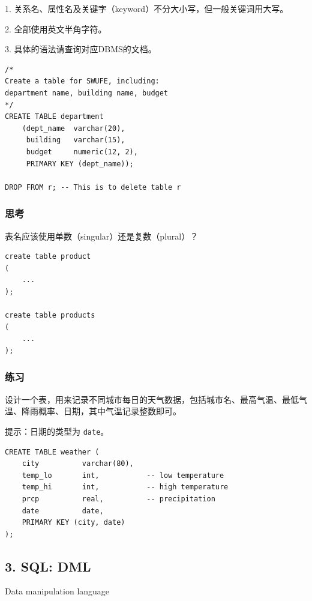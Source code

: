 \documentclass[aspectratio=169, 14pt]{beamer}
\begin{document}
{
\begin{frame}[standout]
    1. 关系名、属性名及关键字（keyword）不分大小写，但一般关键词用大写。

    2. 全部使用英文半角字符。

    3. 具体的语法请查询对应DBMS的文档。
\end{frame}
}

\begin{frame}[fragile]
    \begin{verbatim}
/*
Create a table for SWUFE, including:
department name, building name, budget
*/        
CREATE TABLE department
    (dept_name  varchar(20),
     building   varchar(15),
     budget     numeric(12, 2),
     PRIMARY KEY (dept_name)); 

DROP FROM r; -- This is to delete table r
    \end{verbatim}
\end{frame}
\begin{frame}[fragile]
    \frametitle{思考}
    {\large {}} 表名应该使用单数（singular）还是复数（plural）？

\begin{verbatim}
create table product
(
    ...
);

create table products
(
    ...
);
\end{verbatim}
\end{frame}
\begin{frame}
    \frametitle{练习}
    
    {\large {}} 设计一个表，用来记录不同城市每日的天气数据，包括城市名、最高气温、最低气温、降雨概率、日期，其中气温记录整数即可。

    提示：日期的类型为 \texttt{date}。
\end{frame}

\begin{frame}[fragile]
    \begin{verbatim}
CREATE TABLE weather (
    city          varchar(80),
    temp_lo       int,           -- low temperature
    temp_hi       int,           -- high temperature
    prcp          real,          -- precipitation
    date          date,
    PRIMARY KEY (city, date)
);
    \end{verbatim}
\end{frame}

\begin{frame}
    \section{\textcolor{darkmidnightblue}{3. SQL: DML}}
    Data manipulation language

\end{frame}
\end{document}
